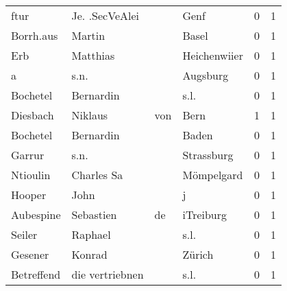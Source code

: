 \begin{center}
\begin{tiny}
\begin{longtabu}{llllrr}
                     ftur &                     Je. .SecVeAlei &             &                                        Genf &          0 &         1 \\
                Borrh.aus &                             Martin &             &                                       Basel &          0 &         1 \\
                      Erb &                           Matthias &             &                                Heichenwiier &          0 &         1 \\
                        a &                               s.n. &             &                                    Augsburg &          0 &         1 \\
                 Bochetel &                          Bernardin &             &                                        s.l. &          0 &         1 \\
                 Diesbach &                            Niklaus &         von &                                        Bern &          1 &         1 \\
                 Bochetel &                          Bernardin &             &                                       Baden &          0 &         1 \\
                   Garrur &                               s.n. &             &                                  Strassburg &          0 &         1 \\
                 Ntioulin &                         Charles Sa &             &                                  Mömpelgard &          0 &         1 \\
                   Hooper &                               John &             &                                           j &          0 &         1 \\
                Aubespine &                          Sebastien &          de &                                   iTreiburg &          0 &         1 \\
                   Seiler &                            Raphael &             &                                        s.l. &          0 &         1 \\
                  Gesener &                             Konrad &             &                                      Zürich &          0 &         1 \\
               Betreffend &                    die vertriebnen &             &                                        s.l. &          0 &         1 \\

\end{longtabu}
\end{tiny}
\end{center}
